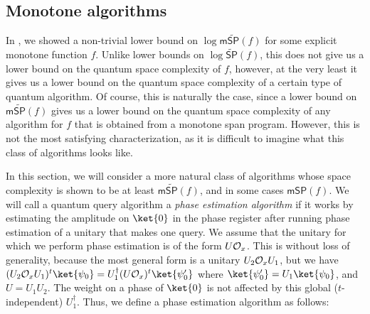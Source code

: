 \documentclass{toc}
\begin{document}
\subsection{Monotone algorithms}\label{sec:monotone-alg}


In , we showed a non-trivial lower bound on $\log\mathsf{m}\widetilde{\mathsf{SP}}(f)$ for some explicit monotone function $f$. Unlike lower bounds on $\log\widetilde{\mathsf{SP}}(f)$, this does not give us a lower bound on the quantum space complexity of $f$, however, at the very least it gives us a lower bound on the quantum space complexity of a certain type of quantum algorithm. Of course, this is naturally the case, since a lower bound on $\mathsf{m}\widetilde{\mathsf{SP}}(f)$ gives us a lower bound on the quantum space complexity of any algorithm for $f$ that is obtained from a monotone span program. However, this is not the most satisfying characterization, as it is difficult to imagine what this class of algorithms looks like. 

In this section, we will consider a more natural class of algorithms whose space complexity is %
shown to be at least %
$\mathsf{m}\widetilde{\mathsf{SP}}(f)$, and in some cases $\mathsf{mSP}(f)$. We will call a quantum query algorithm a \emph{phase estimation algorithm} if it works by estimating the amplitude on $\ket{0}$ in the phase register after running phase estimation of a unitary that makes one query. We assume that the unitary for which we perform phase estimation is of the form $U{\cal O}_x$. This is without loss of generality, because the most general form is a unitary $U_2{\cal O}_xU_1$, but we have $(U_2{\cal O}_x U_1)^t\ket{\psi_0}=U_1^\dagger(U{\cal O}_x)^t\ket{\psi_0'}$ where $\ket{\psi_0'}=U_1\ket{\psi_0}$, and $U=U_1U_2$. The weight on a phase of $\ket{0}$ is not affected by this global ($t$-independent) $U_1^\dagger$. Thus, we define a phase estimation algorithm as follows:
\end{document}
